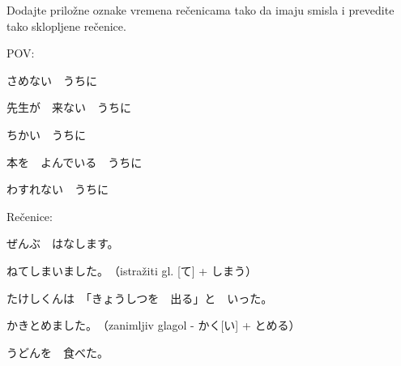 
\author{Tomislav Mamić}

	
	Dodajte priložne oznake vremena rečenicama tako da imaju smisla i prevedite tako sklopljene rečenice.
	
	\begin{mondai}{POV:}
		\item さめない　うちに
		\item 先生が　来ない　うちに
		\item ちかい　うちに
		\item 本を　よんでいる　うちに
		\item わすれない　うちに
	\end{mondai}

	\begin{mondai}{Rečenice:}
		\item ぜんぶ　はなします。
		\item ねてしまいました。　（istražiti gl. [て] + しまう）
		\item たけしくんは　「きょうしつを　出る」と　いった。
		\item かきとめました。　（zanimljiv glagol - かく[い] + とめる）
		\item うどんを　食べた。
	\end{mondai}
